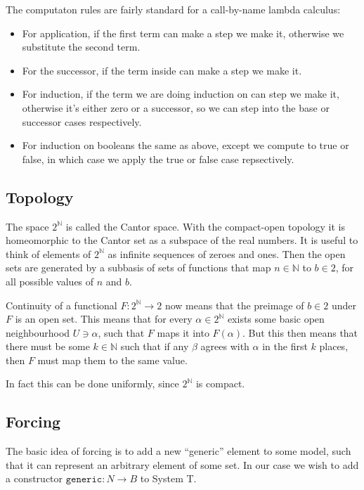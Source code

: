 \documentclass{article}
\def\generic{\texttt{generic}}
\begin{document}
The computaton rules are fairly standard for a call-by-name lambda calculus:
\begin{itemize}
\item For application, if the first term can make a step we make it, otherwise
  we substitute the second term.
\item For the successor, if the term inside can make a step we make it.
\item For induction, if the term we are doing induction on can step we make it,
  otherwise it's either zero or a successor, so we can step into the base or
  successor cases respectively.
\item For induction on booleans the same as above, except we compute to true
  or false, in which case we apply the true or false case repsectively.
\end{itemize}


\subsection{Topology}
The space \(2^ℕ\) is called the Cantor space. With the compact-open topology
it is homeomorphic to the Cantor set as a subspace of the real numbers.
It is useful to think of elements of \(2^ℕ\) as infinite sequences of zeroes and
ones. Then the open sets are generated by a subbasis of sets of functions that
map \(n ∈ ℕ\) to \(b ∈ 2\), for all possible values of \(n\) and \(b\).

Continuity of a functional \(F : 2^ℕ → 2\) now means that the preimage of
\(b ∈ 2\) under \(F\) is an open set.
This means that for every \(α ∈ 2^ℕ\) exists some basic open neighbourhood \(U ∋ α\),
such that \(F\) maps it into \(F(α)\). But this then means that there must be
some \(k ∈ ℕ\) such that if any \(β\) agrees with \(α\) in the first \(k\) places,
then \(F\) must map them to the same value.

In fact this can be done uniformly, since \(2^ℕ\) is compact.

\subsection{Forcing}
The basic idea of forcing is to add a new ``generic'' element to some model,
such that it can represent an arbitrary element of some set.
In our case we wish to add a constructor \(\generic : N → B\) to System T.
\end{document}
